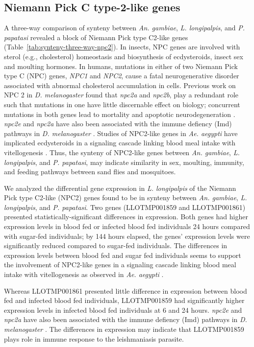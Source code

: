 \subsection{Niemann Pick C type-2-like genes}
A three-way comparison of synteny between \emph{An. gambiae}, \emph{L. longipalpis}, and \emph{P. papatasi} revealed a block of Niemann Pick type C2-like genes (Table~\ref{tab:synteny-three-way-npc2}). In insects, NPC genes are involved with sterol (e.g., cholesterol) homeostasis and biosynthesis of ecdysteroids, insect sex and moulting hormones. In humans, mutations in either of two Niemann Pick type C (NPC) genes, \emph{NPC1} and \emph{NPC2}, cause a fatal neurogenerative disorder associated with abnormal cholesterol accumulation in cells.  Previous work on NPC 2 in \emph{D. melanogaster} found that \emph{npc2a} and \emph{npc2b}, play a redundant role such that mutations in one have little discernable effect on biology; concurrent mutations in both genes lead to mortality and apoptotic neurodegeneration \cite{Huang2007}.  \emph{npc2e} and \emph{npc2a} have also been associated with the immune defiency (Imd) pathways in \emph{D. melanogaster} \cite{Shi2012}. Studies of NPC2-like genes in \emph{Ae. aegypti} have implicated ecdysteroids in a signaling cascade linking blood meal intake with vitellogenesis \cite{Sirot2011}.  Thus, the synteny of NPC2-like genes between \emph{An. gambiae}, \emph{L. longipalpis}, and \emph{P. papatasi}, may indicate similarity in sex, moulting, immunity, and feeding pathways between sand flies and mosquitoes.


We analyzed the differential gene expression in \emph{L. longipalpis} of the Niemann Pick type C2-like (NPC2) genes found to be in synteny between \emph{An. gambiae}, \emph{L. longipalpis}, and \emph{P. papatasi}.  Two genes (LLOTMP001859 and LLOTMP001861) presented statistically-significant differences in expression. Both genes had higher expression levels in blood fed or infected blood fed individuals 24 hours compared with sugar-fed individuals; by 144 hours elapsed, the genes' expression levels were significantly reduced compared to sugar-fed individuals.  The differences in expression levels between blood fed and sugar fed individuals seems to support the involvement of NPC2-like genes in a signaling cascade linking blood meal intake with vitellogenesis as observed in \emph{Ae. aegypti} \cite{Sirot2011}.

Whereas LLOTMP001861 presented little difference in expression between blood fed and infected blood fed individuals, LLOTMP001859 had significantly higher expression levels in infected blood fed individuals at 6 and 24 hours.  \emph{npc2e} and \emph{npc2a} have also been associated with the immune defiency (Imd) pathways in \emph{D. melanogaster} \cite{Shi2012}.  The differences in expression may indicate that LLOTMP001859 plays role in immune response to the leishmaniasis parasite.


